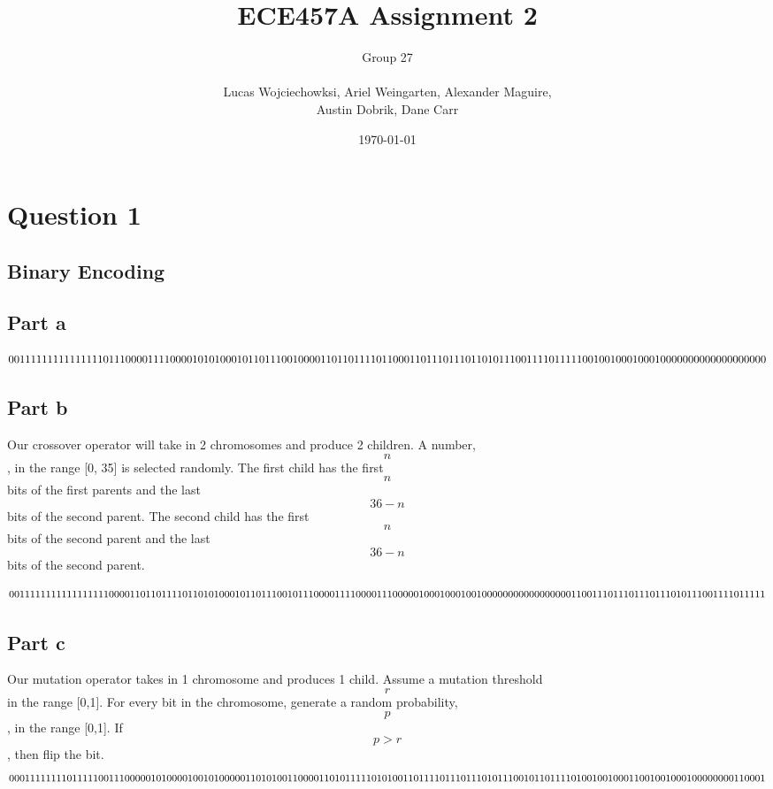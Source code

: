 \documentclass[a4paper]{article}
\title{ECE457A Assignment 2}
\author{
  Group 27 \\
  \\
  Lucas Wojciechowksi, Ariel Weingarten, Alexander Maguire, \\
  Austin Dobrik, Dane Carr}
\date{\today}
\begin{document}
\maketitle

\section{Question 1}

\subsection{Binary Encoding}
\subsection{Part a}
\[
0011111111111111101110000111100001 \\
0101000101101110010000110110111101 \\
1000110111011101101011100111101111 \\
1001001000100010000000000000000000 \\
\]
\subsection{Part b}
Our crossover operator will take in 2 chromosomes and produce 2 children. A number, $$n$$,  in the range [0, 35] is selected randomly. The first child has the first $$n$$ bits of the first parents and the last $$36-n$$ bits of the second parent. The second child has the first $$n$$ bits of the second parent and the last $$36-n$$ bits of the second parent.

\[
0011 11111111111111 1000 01101101111011 \\
0101 00010110111001 0111 00001111000011 \\
1000 00100010001001 0000 00000000000001 \\
1001 11011101110111 0101 11001111011111 \\
\]
\subsection{Part c}
Our mutation operator takes in 1 chromosome and produces 1 child. Assume a mutation threshold $$r$$ in the range [0,1]. For every bit in the chromosome, generate a random probability, $$p$$, in the range [0,1]. If $$p > r$$, then flip the bit.
\[
0001 11111110111110 0111 00000101000010 \\
0101 00000110101001 1000 01101011111010 \\
1001 10111101110111 0101 11001011011110 \\
1001 00100011001001 0001 00000000110001 \\
\]
\end{document}
